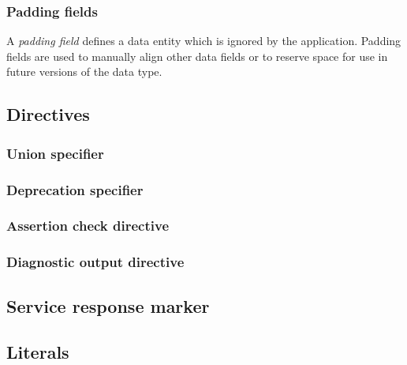 \subsubsection{Padding fields}

A \emph{padding field} defines a data entity which is ignored by the application.
Padding fields are used to manually align other data fields or to reserve space for use in future versions of the
data type.

\subsection{Directives}\label{sec:dsdl_directives}

\subsubsection{Union specifier}

\subsubsection{Deprecation specifier}

\subsubsection{Assertion check directive}

\subsubsection{Diagnostic output directive}

\subsection{Service response marker}\label{sec:dsdl_service_response_marker}

\subsection{Literals}\label{sec:dsdl_literals}
